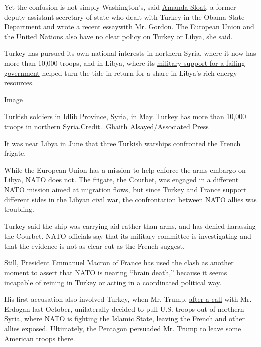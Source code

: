 Yet the confusion is not simply Washington's, said
\href{https://ash.harvard.edu/people/amanda-sloat}{Amanda Sloat}, a
former deputy assistant secretary of state who dealt with Turkey in the
Obama State Department and wrote
\href{https://www.foreignaffairs.com/articles/turkey/2020-01-10/dangerous-unraveling-us-turkish-alliance}{a
recent essay}with Mr. Gordon. The European Union and the United Nations
also have no clear policy on Turkey or Libya, she said.

Turkey has pursued its own national interests in northern Syria, where
it now has more than 10,000 troops, and in Libya, where its
\href{https://www.nytimes3xbfgragh.onion/2020/01/02/world/europe/erdogan-turkey-libya.html}{military
support for a failing government} helped turn the tide in return for a
share in Libya's rich energy resources.

Image

Turkish soldiers in Idlib Province, Syria, in May. Turkey has more than
10,000 troops in northern Syria.Credit...Ghaith Alsayed/Associated Press

It was near Libya in June that three Turkish warships confronted the
French frigate.

While the European Union has a mission to help enforce the arms embargo
on Libya, NATO does not. The frigate, the Courbet, was engaged in a
different NATO mission aimed at migration flows, but since Turkey and
France support different sides in the Libyan civil war, the
confrontation between NATO allies was troubling.

Turkey said the ship was carrying aid rather than arms, and has denied
harassing the Courbet. NATO officials say that its military committee is
investigating and that the evidence is not as clear-cut as the French
suggest.

Still, President Emmanuel Macron of France has used the clash as
\href{https://www.euronews.com/2020/06/23/emmanuel-macron-turkey-is-playing-a-dangerous-game-in-libya}{another
moment to assert} that NATO is nearing ``brain death,'' because it seems
incapable of reining in Turkey or acting in a coordinated political way.

His first accusation also involved Turkey, when Mr. Trump,
\href{https://www.foxnews.com/politics/trump-phone-call-erdogan-turkey-syria}{after
a call} with Mr. Erdogan last October, unilaterally decided to pull U.S.
troops out of northern Syria, where NATO is fighting the Islamic State,
leaving the French and other allies exposed. Ultimately, the Pentagon
persuaded Mr. Trump to leave some American troops there.

